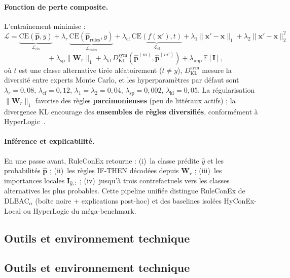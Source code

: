 \documentclass[12pt,a4paper]{article}
\begin{document}
\paragraph{Fonction de perte composite.}
L'entra\^inement minimise :
\begin{equation}
\mathcal{L}=
\underbrace{\mathrm{CE}(\hat{\bm{p}},y)}_{\mathcal{L}_{\mathrm{cls}}}
+\lambda_r\,\underbrace{\mathrm{CE}(\hat{\bm{p}}_{\mathrm{rules}},y)}_{\mathcal{L}_{\mathrm{rules}}}
+\lambda_{\mathrm{cf}}\,\underbrace{\mathrm{CE}(f(\bm{x}'),t)}_{\mathcal{L}_{\mathrm{cf}}}
+\lambda_1\|\bm{x}'-\bm{x}\|_1+\lambda_2\|\bm{x}'-\bm{x}\|_2^2
\label{eq:loss-main}
\end{equation}
\begin{equation}
\quad+\lambda_{\mathrm{sp}}\|\bm{W}_r\|_1
+\lambda_{\mathrm{kl}}\,D_{\mathrm{KL}}^{\mathrm{sym}}(\hat{\bm{p}}^{(m)},\hat{\bm{p}}^{(m')})
+\lambda_{\mathrm{imp}}\,\mathbb{E}[\bm{I}],
\label{eq:loss-reg}
\end{equation}
o\`u $t$ est une classe alternative tir\'ee al\'eatoirement ($t\neq y$), $D_{\mathrm{KL}}^{\mathrm{sym}}$ mesure la diversit\'e entre experts Monte Carlo, et les hyperparam\`etres par d\'efaut sont $\lambda_r=0{,}08$, $\lambda_{\mathrm{cf}}=0{,}12$, $\lambda_1=\lambda_2=0{,}04$, $\lambda_{\mathrm{sp}}=0{,}002$, $\lambda_{\mathrm{kl}}=0{,}05$. La r\'egularisation $\|\bm{W}_r\|_1$ favorise des r\`egles \textbf{parcimonieuses} (peu de litt\'eraux actifs) ; la divergence KL encourage des \textbf{ensembles de r\`egles diversifi\'es}, conform\'ement \`a HyperLogic~\cite{hyperlogic2024}.

\paragraph{Inf\'erence et explicabilit\'e.}
En une passe avant, RuleConEx retourne : (i)~la classe pr\'edite $\hat{y}$ et les probabilit\'es $\hat{\bm{p}}$ ; (ii)~les r\`egles IF-THEN d\'ecod\'ees depuis $\bm{W}_r$ ; (iii)~les importances locales $\bm{I}_{\hat{y},:}$ ; (iv)~jusqu'\`a trois contrefactuels vers les classes alternatives les plus probables. Cette pipeline unifi\'ee distingue RuleConEx de DLBAC$_\alpha$ (bo\^ite noire + explications post-hoc) et des baselines isol\'ees HyConEx-Local ou HyperLogic du m\'ega-benchmark.

\subsection{Outils et environnement technique}
\subsection{Outils et environnement technique}
\end{document}

